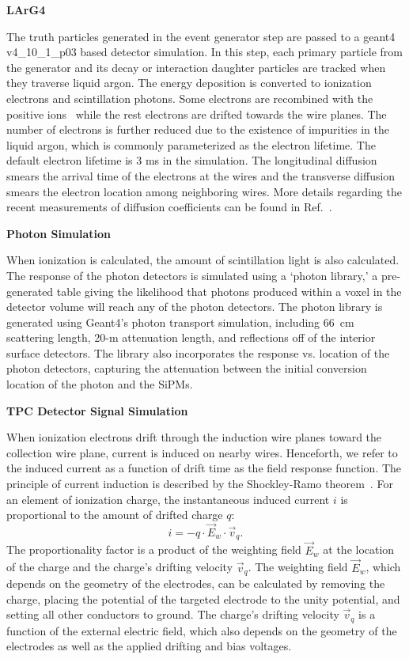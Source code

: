 \textbf{LArG4}

The truth particles generated in the event generator step are passed to a {\sc geant4} v4\_10\_1\_p03 based detector simulation. In this step, each primary particle from the generator and its decay or interaction daughter particles are tracked when they traverse liquid argon. The energy deposition is converted to ionization electrons and scintillation photons. Some electrons are recombined with the positive ions~\cite{Acciarri:2013met,Amoruso:2004dy} while the rest electrons are drifted towards the wire planes. The number of electrons is further reduced due to the existence of impurities in the liquid argon, which is commonly parameterized as the electron lifetime. The default electron lifetime is 3 ms in the simulation. The longitudinal diffusion smears the arrival time of the electrons at the wires and the transverse diffusion smears the electron location among neighboring wires. More details
regarding the recent measurements of diffusion coefficients can be found
in Ref.~\cite{Li:2015rqa,ref:lar_property}.

\textbf{Photon Simulation}

When ionization is calculated, the amount of scintillation light is also calculated. The response of the photon detectors is simulated using a `photon library,' a pre-generated table giving the likelihood that photons produced within a voxel in the detector volume  will reach any of the photon detectors. The photon library is generated using Geant4's photon transport simulation, including 66~cm scattering length, 20-m attenuation length, and reflections off of the interior surface detectors. The library also incorporates the response vs. location of the photon detectors, capturing the attenuation between the initial conversion location of the photon and the SiPMs.

\textbf{TPC Detector Signal Simulation}

When ionization electrons drift through the induction wire planes toward the collection wire plane, current is induced on nearby wires. Henceforth, we refer to the induced current as a function of drift time as the field response function. 
The principle of current induction is described by the Shockley-Ramo theorem~\cite{Shockley1938,Ramo:1939vr}. For an element of ionization charge, the instantaneous induced current $i$ is proportional to the amount of drifted charge $q$: 
\begin{equation}\label{eq:shockley_ramo}
  i = - q \cdot \vec{E}_w \cdot \vec{v}_q.
\end{equation}
The proportionality factor is a product of the weighting field $\vec{E}_w$ at the location of the charge and the charge's drifting velocity $\vec{v}_q$. The weighting field $\vec{E}_w$, which depends on the geometry of the electrodes, can be calculated by removing the charge, placing the potential of the targeted electrode to the unity potential, and setting all other conductors to ground. The charge's drifting velocity $\vec{v}_q$ is a function of the external electric field, which also depends on the geometry of the electrodes as well as the applied drifting and bias voltages.

